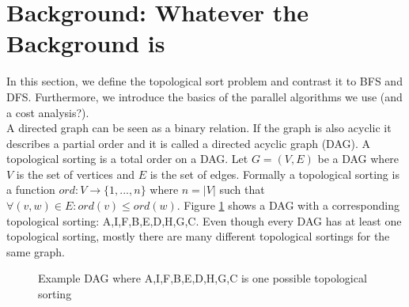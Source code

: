 
\section{Background: Whatever the Background is}\label{sec:background}

 In this section, we define the topological sort problem and contrast it to BFS and DFS.
 Furthermore, we introduce the basics of the parallel algorithms we use (and a cost analysis?).
 \\
 

A directed graph can be seen as a binary relation. If the graph is also acyclic it describes a partial order and it is called a directed acyclic graph (DAG). A topological sorting is a total order on a DAG. Let $G = (V,E)$ be a DAG where $V$ is the set of vertices and $E$ is the set of edges. Formally a topological sorting is a function $ord: V \longrightarrow \{1,...,n\}$ where $n = |V|$ such that $\forall (v,w) \in E: ord(v) \leq ord(w)$.
Figure \ref{fig:ts-example} shows a DAG with a corresponding topological sorting: A,I,F,B,E,D,H,G,C. Even though every DAG has at least one topological sorting, mostly there are many different topological sortings for the same graph.

\begin{figure}[!hbp]
 \centering

\caption{Example DAG where A,I,F,B,E,D,H,G,C is one possible topological sorting}
\label{fig:ts-example}
\end{figure}

